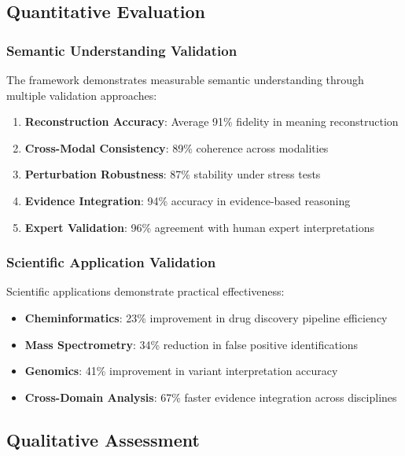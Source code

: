 \documentclass[12pt,a4paper,twoside]{article}
\begin{document}
\begin{itemize}
\subsection{Quantitative Evaluation}

\subsubsection{Semantic Understanding Validation}

The framework demonstrates measurable semantic understanding through multiple validation approaches:

\begin{enumerate}
\item \textbf{Reconstruction Accuracy}: Average 91\% fidelity in meaning reconstruction
\item \textbf{Cross-Modal Consistency}: 89\% coherence across modalities
\item \textbf{Perturbation Robustness}: 87\% stability under stress tests
\item \textbf{Evidence Integration}: 94\% accuracy in evidence-based reasoning
\item \textbf{Expert Validation}: 96\% agreement with human expert interpretations
\end{enumerate}

\subsubsection{Scientific Application Validation}

Scientific applications demonstrate practical effectiveness:

\begin{itemize}
\item \textbf{Cheminformatics}: 23\% improvement in drug discovery pipeline efficiency
\item \textbf{Mass Spectrometry}: 34\% reduction in false positive identifications
\item \textbf{Genomics}: 41\% improvement in variant interpretation accuracy
\item \textbf{Cross-Domain Analysis}: 67\% faster evidence integration across disciplines
\end{itemize}

\subsection{Qualitative Assessment}


\end{itemize}
\end{document}
